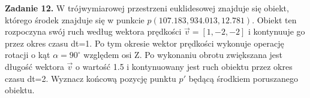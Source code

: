 \documentclass[a4paper]{article}
\begin{document}
\noindent\textbf{Zadanie 12.}
\noindent\textnormal{W trójwymiarowej przestrzeni euklidesowej znajduje się obiekt, którego środek
znajduje się w punkcie $p(107.183, 934.013, 12.781)$. Obiekt ten rozpoczyna
swój ruch według wektora prędkości $\vec{v}=[1, -2, -2]$ i kontynuuje go przez okres
czasu dt=1. Po tym okresie wektor prędkości wykonuje operację rotacji o kąt
$\alpha=90^{\circ}$ względem osi Z. Po wykonaniu obrotu zwiększana jest długość wektora $\vec{v}$
o wartość 1.5 i kontynuowany jest ruch obiektu przez okres czasu dt=2. Wyznacz końcową pozycję punktu $p'$ będącą środkiem poruszanego obiektu.}\\
\end{document}
